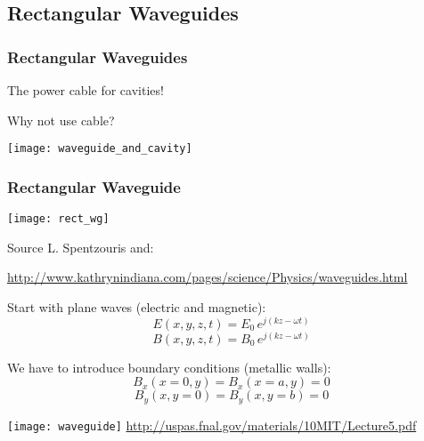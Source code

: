 \documentclass[professionalfonts,t]{beamer}
\begin{document}
\subsection{Rectangular Waveguides}
\begin{frame}
	\frametitle{Rectangular Waveguides}
	\centering
	The power cable for cavities!
	
	\begin{minipage}{0.4\textwidth}
		
		Why not use cable?
	\end{minipage}
\begin{minipage}{0.5\textwidth}
	\texttt{[image: waveguide\_and\_cavity]}
\end{minipage}
\end{frame}


\begin{frame}
\frametitle{Rectangular Waveguide}
\begin{center}
	\texttt{[image: rect\_wg]}
\end{center}

Source L. Spentzouris and:

\tiny\url{http://www.kathrynindiana.com/pages/science/Physics/waveguides.html}
\end{frame}

\begin{frame}
		Start with plane waves (electric and magnetic):
	\begin{equation}
	E\left(x,y,z,t\right) =E_0\,e^{j\left(kz-\omega t\right)}
	\end{equation}
	\begin{equation}
	B\left(x,y,z,t\right) =B_0\,e^{j\left(kz-\omega t\right)}
	\end{equation}
\end{frame}

\begin{frame}
	We have to introduce boundary conditions (metallic walls):
		\begin{equation}
			B_x\left(x=0,y\right) = B_x\left(x=a,y\right)= 0
		\end{equation}
		\begin{equation}
			B_y\left(x,y=0\right) = B_y\left(x,y=b\right)=0
		\end{equation}
		
	\vspace{-0.3em}
\centering
\texttt{[image: waveguide]}	
\small\url{http://uspas.fnal.gov/materials/10MIT/Lecture5.pdf}
\end{frame}
\end{document}

